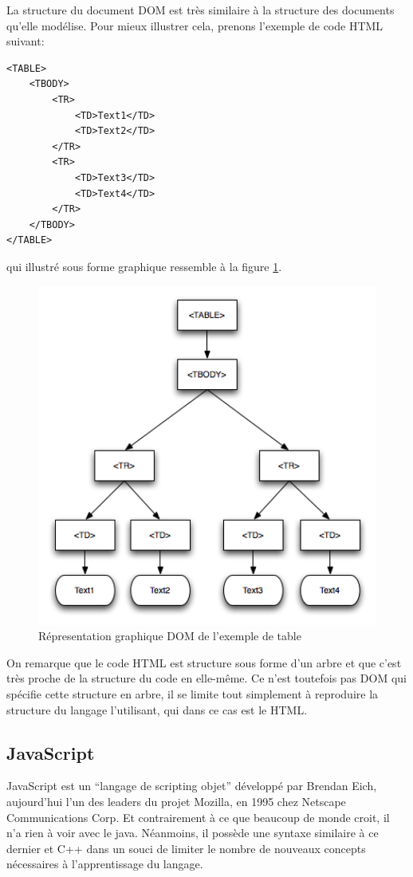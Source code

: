 \documentclass[10pt,a4paper,titlepage]{article}
\begin{document}
La structure du document DOM est très similaire à la structure des documents qu'elle modélise. Pour mieux illustrer cela, prenons l'exemple de code HTML suivant:

\begin{lstlisting}
<TABLE>
	<TBODY> 
		<TR> 
			<TD>Text1</TD>
			<TD>Text2</TD> 
		</TR> 
		<TR>
			<TD>Text3</TD>        
			<TD>Text4</TD> 
		</TR> 
	</TBODY>
</TABLE>
\end{lstlisting}

qui illustré sous forme graphique ressemble à la figure \ref{dom1}.

\begin{figure}[h]
	\begin{center}
			\includegraphics[width=12cm]{img/exempleDOM.png}
			\caption{Répresentation graphique DOM de l'exemple de table}
			\label{dom1}
	\end{center}
\end{figure}

On remarque que le code HTML est structure sous forme d'un arbre et que c'est très proche de la structure du code en elle-même. Ce n'est toutefois pas DOM qui spécifie cette structure en arbre, il se limite tout simplement à reproduire la structure du langage l'utilisant, qui dans ce cas est le HTML.

\subsection{JavaScript}
JavaScript est un “langage de scripting objet” développé par Brendan Eich, aujourd'hui l'un des leaders du projet Mozilla, en 1995 chez Netscape Communications Corp. Et contrairement à ce que beaucoup de monde croit, il n'a rien à voir avec le java. Néanmoins, il possède une syntaxe similaire à ce dernier et C++ dans un souci de limiter le nombre de nouveaux concepts nécessaires à l'apprentissage du langage.\\
\end{document}
